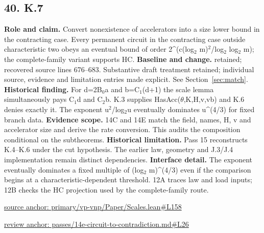 \documentclass[11pt,letterpaper]{article}
\theoremstyle{definition}\newtheorem{definition}[theorem]{Definition}\newtheorem{example}[theorem]{Example}
\theoremstyle{remark}\newtheorem{remark}[theorem]{Remark}
\begin{document}
\subsection*{40. K.7}
\textbf{Role and claim.} Convert nonexistence of accelerators into a size lower bound in the contracting case. Every permanent circuit in the contracting case outside characteristic two obeys an eventual bound of order 2\textasciicircum{}(c(log\ensuremath{{}_2} m)\ensuremath{{}^2}/log\ensuremath{{}_2} log\ensuremath{{}_2} m); the complete-family variant supports HC.
\textbf{Baseline and change.} retained; recovered source lines 676--683. Substantive draft treatment retained; individual source, evidence and limitation entries made explicit. See Section~\ref{sec:match}.
\textbf{Historical finding.} For d=2B\ensuremath{{}_0}a and b=C\ensuremath{{}_1}(d+1) the scale lemma simultaneously pays C\ensuremath{{}_1}d and C\ensuremath{{}_2}b. K.3 supplies HasAcc(\ensuremath{\theta},K,H,v,vb) and K.6 denies exactly it. The exponent u\ensuremath{{}^2}/log\ensuremath{{}_2}u eventually dominates u\textasciicircum{}(4/3) for fixed branch data.
\textbf{Evidence scope.} 14C and 14E match the field, names, H, v and accelerator size and derive the rate conversion. This audits the composition conditional on the subtheorems.
\textbf{Historical limitation.} Pass 15 reconstructs K.4–K.6 under the cut hypothesis. The earlier law, geometry and J.3/J.4 implementation remain distinct dependencies.
\textbf{Interface detail.} The exponent eventually dominates a fixed multiple of (log\ensuremath{{}_2} m)\textasciicircum{}(4/3) even if the comparison begins at a characteristic-dependent threshold. 12A traces law and load inputs; 12B checks the HC projection used by the complete-family route.
\par\href{https://github.com/nousentllc/VP-VNP-Review/blob/8a7976933b6b2b4ffda1ad3a0dfb5fc6b6f023e8/primary/vp-vnp/Paper/Scales.lean\#L158}{source anchor: primary/vp-vnp/Paper/Scales.lean\#L158}
\par\href{https://github.com/nousentllc/VP-VNP-Review/blob/8a7976933b6b2b4ffda1ad3a0dfb5fc6b6f023e8/passes/14e-circuit-to-contradiction.md\#L26}{review anchor: passes/14e-circuit-to-contradiction.md\#L26}
\goodbreak
\end{document}
